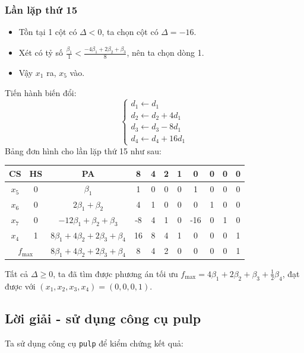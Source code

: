 \documentclass[12pt]{article}
\begin{document}
\subsubsection{Lần lặp thứ 15}
\begin{itemize}
\item Tồn tại 1 cột có $\Delta < 0$, ta chọn cột có $\Delta = -16$.
\item Xét có tỷ số $\displaystyle \frac{\beta_1}{1} < \frac{-4\beta_1 + 2\beta_2 + \beta_3}{8}$, nên ta chọn dòng 1.
\item Vậy $x_1$ ra, $x_5$ vào.
\end{itemize}
Tiến hành biến đổi:
$$
\left\{
\begin{array}{lll}
d_1 \leftarrow d_1 \\
d_2 \leftarrow d_2 + 4d_1\\
d_3 \leftarrow d_3 - 8d_1\\
d_4 \leftarrow d_4 + 16d_1
\end{array}
\right.
$$
Bảng đơn hình cho lần lặp thứ 15 như sau:
\begin{table}[H]
\centering
\begin{tabular}{|c|c|c|c|c|c|c|c|c|c|c|}
\hline
CS & HS & PA & 8 & 4 & 2 & 1 & 0 & 0 & 0 & 0 \\
\hline
$x_5$ & 0 & $\beta_1$ & 1 & 0 & 0 & 0 & 1 & 0 & 0 & 0 \\
$x_6$ & 0 & $2\beta_1 + \beta_2$ & 4 & 1 & 0 & 0 & 0 & 1 & 0 & 0 \\
$x_7$ & 0 & $-12\beta_1 + \beta_2 + \beta_3$ & -8 & 4 & 1 & 0 & -16 & 0 & 1 & 0 \\
$x_4$ & 1 & $8\beta_1 + 4\beta_2 + 2\beta_3 + \beta_4$ & 16 & 8 & 4 & 1 & 0 & 0 & 0 & 1 \\
\hline
\multicolumn{2}{|c|}{$f_{\max}$}
& $8\beta_1 + 4\beta_2 + 2\beta_3 + \beta_4$ & 8 & 4 & 2 & 0 & 0 & 0 & 0 & 1 \\
\hline
\end{tabular}
\end{table}
\noindent Tất cả $\Delta \geq 0$, ta đã tìm được phương án tối ưu $\displaystyle f_{\max} = 4\beta_1 + 2\beta_2 + \beta_3 + \frac{1}{2}\beta_4$, đạt được với $(x_1, x_2, x_3, x_4) = (0, 0, 0, 1)$.

\subsection{Lời giải - sử dụng công cụ pulp}
Ta sử dụng công cụ \texttt{pulp} để kiểm chứng kết quả:
\end{document}
